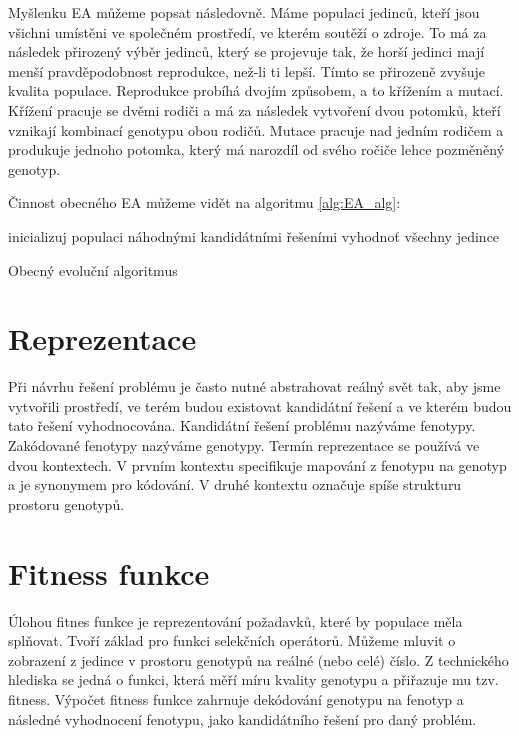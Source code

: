 Myšlenku EA můžeme popsat následovně.
Máme populaci jedinců, kteří jsou všichni umístěni ve společném prostředí, ve kterém soutěží o zdroje.
To má za následek přirozený výběr jedinců, který se projevuje tak, že horší jedinci mají menší pravděpodobnost reprodukce, než-li ti lepší.
Tímto se přirozeně zvyšuje kvalita populace.
Reprodukce probíhá dvojím způsobem, a to křížením a mutací.
Křížení pracuje se dvěmi rodiči a má za následek vytvoření dvou potomků, kteří vznikají kombinací genotypu obou rodičů.
Mutace pracuje nad jedním rodičem a produkuje jednoho potomka, který má narozdíl od svého ročiče lehce pozměněný genotyp.

Činnost obecného EA můžeme vidět na algoritmu \ref{alg:EA_alg}:


\begin{algorithm}[H]
    inicializuj populaci náhodnými kandidátními řešeními\;
    vyhodnoť všechny jedince\;
    \caption{Obecný evoluční algoritmus}
    \label{alg:EA_alg}
\end{algorithm}

\section{Reprezentace}
Při návrhu řešení problému je často nutné abstrahovat reálný svět tak, aby jsme vytvořili prostředí, ve terém budou existovat kandidátní řešení a ve kterém budou tato řešení vyhodnocována.
Kandidátní řešení problému nazýváme fenotypy.
Zakódované fenotypy nazýváme genotypy.
Termín reprezentace se používá ve dvou kontextech.
V prvním kontextu specifikuje mapování z fenotypu na genotyp a je synonymem pro kódování.
V druhé kontextu označuje spíše strukturu prostoru genotypů.

\section{Fitness funkce}
Úlohou fitnes funkce je reprezentování požadavků, které by populace měla splňovat.
Tvoří základ pro funkci selekčních operátorů.
Můžeme mluvit o zobrazení z jedince v prostoru genotypů na reálné (nebo celé) číslo.
Z technického hlediska se jedná o funkci, která měří míru kvality genotypu a přiřazuje mu tzv. fitness.
Výpočet fitness funkce zahrnuje dekódování genotypu na fenotyp a následné vyhodnocení fenotypu, jako kandidátního řešení pro daný problém.

